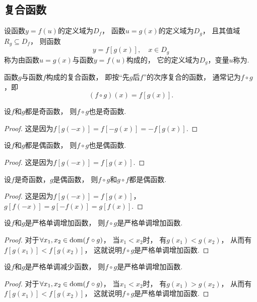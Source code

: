 \subsection{复合函数}
\begin{definition}
设函数\(y=f(u)\)的定义域为\(D_f\)，
函数\(u=g(x)\)的定义域为\(D_g\)，
且其值域\(R_g \subseteq D_f\)，
则函数\[
	y = f[g(x)],
	\quad x \in D_g
\]
称为由函数\(u=g(x)\)与函数\(y=f(u)\)构成的，
它的定义域为\(D_g\)，变量\(u\)称为.

函数\(g\)与函数\(f\)构成的复合函数，
即按“先\(g\)后\(f\)”的次序复合的函数，
通常记为\(f \circ g\)，即\[
	(f \circ g)(x) = f[g(x)].
\]
\end{definition}

\begin{proposition}
设\(f\)和\(g\)都是奇函数，
则\(f \circ g\)也是奇函数.
\begin{proof}
这是因为\(f[g(-x)]
= f[-g(x)]
= -f[g(x)]\).
\end{proof}
\end{proposition}

\begin{proposition}
设\(f\)和\(g\)都是偶函数，
则\(f \circ g\)也是偶函数.
\begin{proof}
这是因为\(f[g(-x)]
= f[g(x)]\).
\end{proof}
\end{proposition}

\begin{proposition}
设\(f\)是奇函数，\(g\)是偶函数，
则\(f \circ g\)和\(g \circ f\)都是偶函数.
\begin{proof}
这是因为\(f[g(-x)]
= f[g(x)]\)，
\(g[f(-x)]
= g[-f(x)]
= g[f(x)]\).
\end{proof}
\end{proposition}

\begin{proposition}
设\(f\)和\(g\)是严格单调增加函数，
则\(f \circ g\)是严格单调增加函数.
\begin{proof}
对于\(\forall x_1,x_2 \in \operatorname{dom}(f \circ g)\)，
当\(x_1 < x_2\)时，
有\(g(x_1) < g(x_2)\)，
从而有\(f[g(x_1)] < f[g(x_2)]\)，
这就说明\(f \circ g\)是严格单调增加函数.
\end{proof}
\end{proposition}

\begin{proposition}
设\(f\)和\(g\)是严格单调减少函数，
则\(f \circ g\)是严格单调增加函数.
\begin{proof}
对于\(\forall x_1,x_2 \in \operatorname{dom}(f \circ g)\)，
当\(x_1 < x_2\)时，
有\(g(x_1) > g(x_2)\)，
从而有\(f[g(x_1)] < f[g(x_2)]\)，
这就说明\(f \circ g\)是严格单调增加函数.
\end{proof}
\end{proposition}

